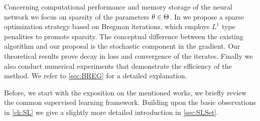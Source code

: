 Concerning computational performance and memory storage of the neural network we focus on sparsity of the parameters $\theta\in\Theta$. In \cite{bungert2022bregman} we propose a sparse optimization strategy based on Bregman iterations, which employs $L^1$ type penalities to promote sparsity. The conceptual difference between the existing algorithm and our proposal is the stochastic component in the gradient. Our theoretical results prove decay in loss and convergence of the iterates. Finally we also conduct numerical experiments that demonstrate the efficiency of the method. We refer to \cref{sec:BREG} for a detailed explanation.

Before, we start with the exposition on the mentioned works, we briefly review the common supervised learning framework. Building upon the basic observations in \cref{ch:SL} we give a slightly more detailed introduction in \cref{sec:SLSet}.






